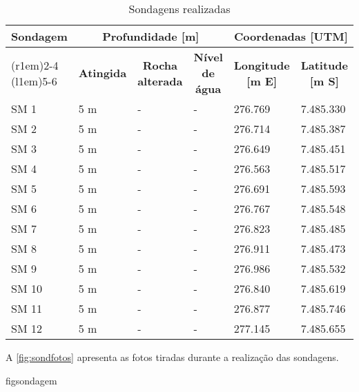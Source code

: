 \begin{table}[htb!]
	\renewcommand{\multirowsetup}{\centering}
	\renewcommand\tabularxcolumn[1]{m{#1}}
	\centering
	\caption{Sondagens realizadas}
	\label{tab:sondspec}
	\begin{tabularx}{\textwidth}{l X X X X X}
		\toprule
		\multirow{3}{*}{\textbf{Sondagem}} & 
		\multicolumn{3}{c}{\textbf{Profundidade [m]}} &
		\multicolumn{2}{c}{\textbf{Coordenadas [UTM]}}\\
		\cmidrule(r{1em}){2-4}
		\cmidrule(l{1em}){5-6}
		&
		\multicolumn{1}{c}{\textbf{Atingida}} &
		\multicolumn{1}{c}{\textbf{Rocha alterada}} &
		\multicolumn{1}{c}{\textbf{Nível de água}} &
		\multicolumn{1}{c}{\textbf{Longitude [m E]}} &
		\multicolumn{1}{c}{\textbf{Latitude [m S]}} \\
		\midrule
SM  1 & 5 m & - & - & 276.769 & 7.485.330\\
SM  2 & 5 m & - & - & 276.714 & 7.485.387\\
SM  3 & 5 m & - & - & 276.649 & 7.485.451\\
SM  4 & 5 m & - & - & 276.563 & 7.485.517\\
SM  5 & 5 m & - & - & 276.691 & 7.485.593\\
SM  6 & 5 m & - & - & 276.767 & 7.485.548\\
SM  7 & 5 m & - & - & 276.823 & 7.485.485\\
SM  8 & 5 m & - & - & 276.911 & 7.485.473\\
SM  9 & 5 m & - & - & 276.986 & 7.485.532\\
SM 10 & 5 m & - & - & 276.840 & 7.485.619\\
SM 11 & 5 m & - & - & 276.877 & 7.485.746\\
SM 12 & 5 m & - & - & 277.145 & 7.485.655\\
		\bottomrule		
	\end{tabularx}
\end{table}
\FloatBarrier


A \cref{fig:sondfotos} apresenta as fotos tiradas
durante a realização das sondagens.

{figsondagem}
